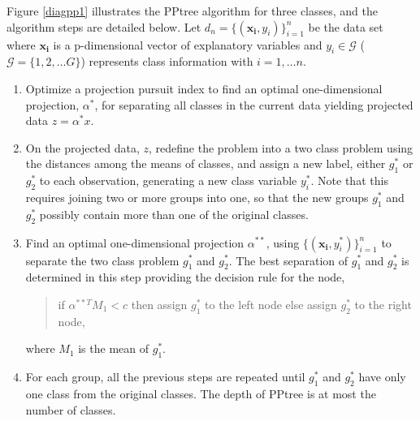 \documentclass[12pt]{article}\usepackage[]{graphicx}\usepackage[]{color}
\begin{document}
Figure \ref{diagpp1} illustrates the PPtree algorithm for three classes, and the algorithm steps are detailed below. Let  $d_n =\{(\mathbf{x_i},y_i)\}_{i=1}^n$ be the data set where $\mathbf{x_i}$ is a  p-dimensional vector of explanatory variables and  $y_i\in \mathscr{G}$ ($\mathscr{G} =\{1,2,\ldots G\}$) represents class information with $i=1,\ldots n$.

\begin{enumerate}
\item Optimize a projection pursuit index to find an optimal one-dimensional projection, $\alpha^*$, for separating all classes in the current data yielding projected data $z = \alpha^*x$.
\item On the projected data, $z$, redefine the problem into a two class problem using the distances among the means of classes, and assign a new label, either $g_1^*$ or $g_2^*$ to each observation, generating a new class variable $y_i^*$. Note that this requires joining two or more groups into one, so that the new groups $g_1^*$ and $g_2^*$ possibly contain more than one of the original classes. 

\item Find an optimal one-dimensional projection $\alpha^{**}$, using $\{(\mathbf{x_i},y_i^*)\}_{i=1}^n$ to separate the two class problem $g_1^*$ and $g_2^*$. The best separation of $g_1^*$ and $g_2^*$ is determined in this step providing the decision rule for the node,

\begin{quote}
if $\alpha^{**T}M_1< c$ then assign $g_1^*$ to the left node else assign $g_2^*$ to the right node,
\end{quote}
\noindent where $M_1$ is the mean of $g_1^*$.
\item For each group, all the previous steps are repeated until $g_1^*$ and $g_2^*$ have only one class from the original classes. The depth of PPtree is at most the number of classes.
\end{enumerate}
\end{document}
